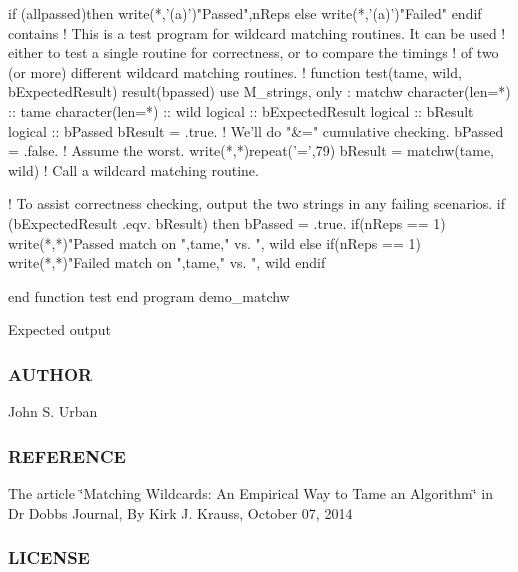 \begin{DoxyVerb}
 if (allpassed)then
    write(*,'(a)')"Passed",nReps
 else
    write(*,'(a)')"Failed"
 endif
contains
! This is a test program for wildcard matching routines. It can be used
! either to test a single routine for correctness, or to compare the timings
! of two (or more) different wildcard matching routines.
!
function test(tame, wild, bExpectedResult) result(bpassed)
use M_strings, only : matchw
   character(len=*) :: tame
   character(len=*) :: wild
   logical          :: bExpectedResult
   logical          :: bResult
   logical          :: bPassed
   bResult = .true.    ! We'll do "&=" cumulative checking.
   bPassed = .false.   ! Assume the worst.
   write(*,*)repeat('=',79)
   bResult = matchw(tame, wild) ! Call a wildcard matching routine.

   ! To assist correctness checking, output the two strings in any failing scenarios.
   if (bExpectedResult .eqv. bResult) then
      bPassed = .true.
      if(nReps == 1) write(*,*)"Passed match on ",tame," vs. ", wild
   else
      if(nReps == 1) write(*,*)"Failed match on ",tame," vs. ", wild
   endif

end function test
end program demo_matchw
\end{DoxyVerb}


Expected output

\subsubsection*{A\+U\+T\+H\+OR}

John S. Urban

\subsubsection*{R\+E\+F\+E\+R\+E\+N\+CE}

The article \char`\"{}\+Matching Wildcards\+: An Empirical Way to Tame an Algorithm\char`\"{} in Dr Dobb\textquotesingle{}s Journal, By Kirk J. Krauss, October 07, 2014

\subsubsection*{L\+I\+C\+E\+N\+SE}

